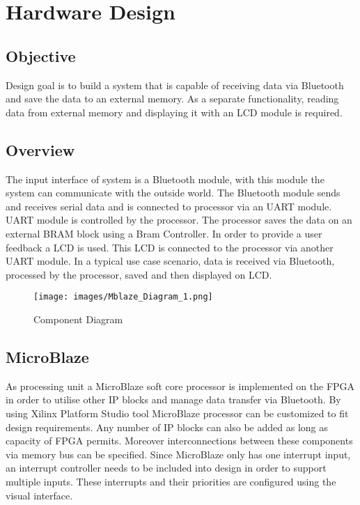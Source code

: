 
\chapter{Hardware Design}

\section{Objective}
Design goal is to build a system that is capable of receiving data via Bluetooth and save the data to an external memory. As a separate functionality, reading data from external memory and displaying it with an LCD module is required.


\section{Overview}

The input interface of system is a Bluetooth module, with this module the system can communicate with the outside world. The Bluetooth module sends and receives serial data and is connected to processor via an UART module. UART module is controlled by the processor. The processor saves the data on an external BRAM block using a Bram Controller. In order to provide a user feedback a LCD is used. This LCD is connected to the processor via another UART module. In a typical use case scenario, data is received via Bluetooth, processed by the processor, saved and then displayed on LCD. 


\begin{figure}
	\centering
	\texttt{[image: images/Mblaze\_Diagram\_1.png]}
	\caption{Component Diagram}
\end{figure}

\section{MicroBlaze}
As processing unit a MicroBlaze soft core processor is implemented on the FPGA in order to utilise other IP blocks and manage data transfer via Bluetooth. 
By using Xilinx Platform Studio tool MicroBlaze processor can be customized to fit design requirements. Any number of IP blocks can also be added as long as capacity of FPGA permits. Moreover interconnections between these components via memory bus can be specified. Since MicroBlaze only has one interrupt input, an interrupt controller needs to be included into design in order to support multiple inputs. These interrupts and their priorities are configured using the visual interface.

